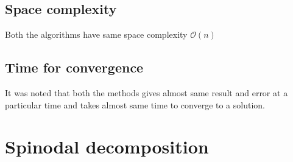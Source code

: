 \documentclass{article}
\begin{document}
\subsection*{Space complexity}
Both the algorithms have same space complexity  $\mathcal{O}(n)$
\subsection*{Time for convergence}
It was noted that both the methods gives almost same result and error at a particular time and takes almost same time to converge to a solution. 




\section{Spinodal decomposition}
\end{document}
